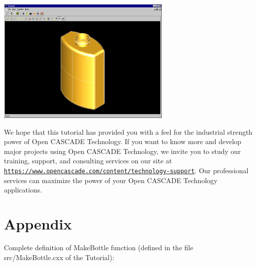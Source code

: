 \begin{DoxyImageNoCaption}
\begin{center}
   \mbox{\includegraphics[width=320]{tutorial_image019.png}}
\end{center}
\end{DoxyImageNoCaption}


We hope that this tutorial has provided you with a feel for the industrial strength power of Open C\+A\+S\+C\+A\+DE Technology. If you want to know more and develop major projects using Open C\+A\+S\+C\+A\+DE Technology, we invite you to study our training, support, and consulting services on our site at \href{https://www.opencascade.com/content/technology-support}{\tt https\+://www.\+opencascade.\+com/content/technology-\/support}. Our professional services can maximize the power of your Open C\+A\+S\+C\+A\+DE Technology applications.\hypertarget{occt__tutorial_sec6}{}\section{Appendix}\label{occt__tutorial_sec6}
Complete definition of Make\+Bottle function (defined in the file src/\+Make\+Bottle.\+cxx of the Tutorial)\+:


